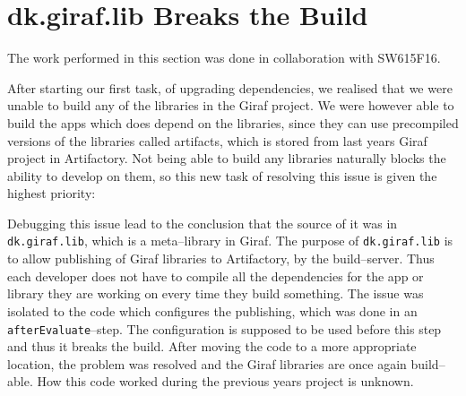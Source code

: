 \section{dk.giraf.lib Breaks the Build}\label{sec:breaking}
The work performed in this section was done in collaboration with SW615F16.

After starting our first task, of upgrading dependencies, we realised that we were unable to build any of the libraries in the Giraf project.
We were however able to build the apps which does depend on the libraries, since they can use precompiled versions of the libraries called artifacts, which is stored from last years Giraf project in Artifactory.
Not being able to build any libraries naturally blocks the ability to develop on them, so this new task of resolving this issue is given the highest priority: \pblocking

Debugging this issue lead to the conclusion that the source of it was in \texttt{dk.giraf.lib}, which is a meta--library in Giraf.
The purpose of \texttt{dk.giraf.lib} is to allow publishing of Giraf libraries to Artifactory, by the build--server.
Thus each developer does not have to compile all the dependencies for the app or library they are working on every time they build something.
The issue was isolated to the code which configures the publishing, which was done in an \texttt{afterEvaluate}--step.
The configuration is supposed to be used before this step and thus it breaks the build.
After moving the code to a more appropriate location, the problem was resolved and the Giraf libraries are once again build--able.
How this code worked during the previous years project is unknown.
